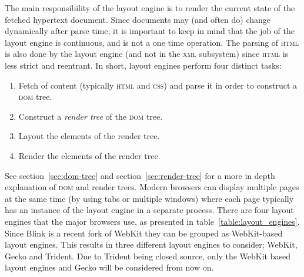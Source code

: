 \documentclass[a4paper,11pt]{kth-mag}
\begin{document}
      The main responsibility of the layout engine is to render the current state of the fetched hypertext document.
      Since documents may (and often do) change dynamically after parse time, it is important to keep in mind that the job of the layout engine is continuous, and is not a one time operation.
      The parsing of \textsc{html} is also done by the layout engine (and not in the \textsc{xml} subsystem) since \textsc{html} is less strict and reentrant.
      In short, layout engines perform four distinct tasks:
      \begin{enumerate}
        \item Fetch of content (typically \textsc{html} and \textsc{css}) and parse it in order to construct a \textsc{dom} tree.
        \item Construct a \emph{render tree} of the \textsc{dom} tree.
        \item Layout the elements of the render tree.
        \item Render the elements of the render tree.
      \end{enumerate}
      See section~\ref{sec:dom-tree} and section~\ref{sec:render-tree} for a more in depth explanation of \textsc{dom} and render trees.
      Modern browsers can display multiple pages at the same time (by using tabs or multiple windows) where each page typically has an instance of the layout engine in a separate process.
      There are four layout engines that the major browsers use, as presented in table~\ref{table:layout_engines}.
      Since Blink is a recent fork of WebKit they can be grouped as WebKit-based layout engines.
      This results in three different layout engines to consider; WebKit, Gecko and Trident.
      Due to Trident being closed source, only the WebKit based layout engines and Gecko will be considered from now on.
\end{document}
